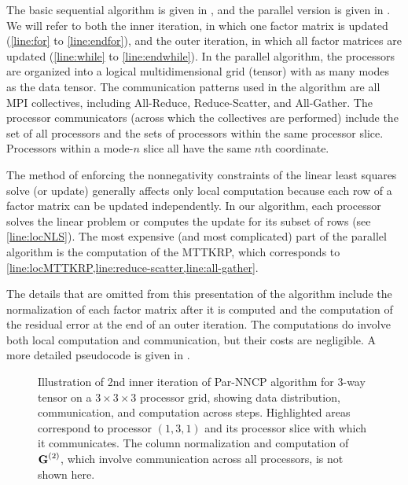 The basic sequential algorithm is given in , and the parallel version is given in .
We will refer to both the inner iteration, in which one factor matrix is updated (\cref{line:for} to \cref{line:endfor}), and the outer iteration, in which all factor matrices are updated (\cref{line:while} to \cref{line:endwhile}).
In the parallel algorithm, the processors are organized into a logical multidimensional grid (tensor) with as many modes as the data tensor.
The communication patterns used in the algorithm are all MPI collectives, including All-Reduce, Reduce-Scatter, and All-Gather.
The processor communicators (across which the collectives are performed) include the set of all processors and the sets of processors within the same processor slice.
Processors within a mode-$n$ slice all have the same $n$th coordinate.

The method of enforcing the nonnegativity constraints of the linear least squares solve (or update) generally affects only local computation because each row of a factor matrix can be updated independently.
In our algorithm, each processor solves the linear problem or computes the update for its subset of rows (see \cref{line:locNLS}). 
The most expensive (and most complicated) part of the parallel algorithm is the computation of the MTTKRP, which corresponds to \cref{line:locMTTKRP,line:reduce-scatter,line:all-gather}.

The details that are omitted from this presentation of the algorithm include the normalization of each factor matrix after it is computed and the computation of the residual error at the end of an outer iteration.
The computations do involve both local computation and communication, but their costs are negligible.
A more detailed pseudocode is given in .


\begin{figure*}[t]
\centering
    \quad
    \quad
   \quad
   \quad
  \caption{Illustration of 2nd inner iteration of Par-NNCP algorithm for 3-way tensor on a $3\times3\times3$ processor grid, showing data distribution, communication, and computation across steps.  Highlighted areas correspond to processor $(1,3,1)$ and its processor slice with which it communicates.  The column normalization and computation of $\Mn{G}{2}$, which involve communication across all processors, is not shown here.}
  \label{fig:inner} 
\end{figure*}

